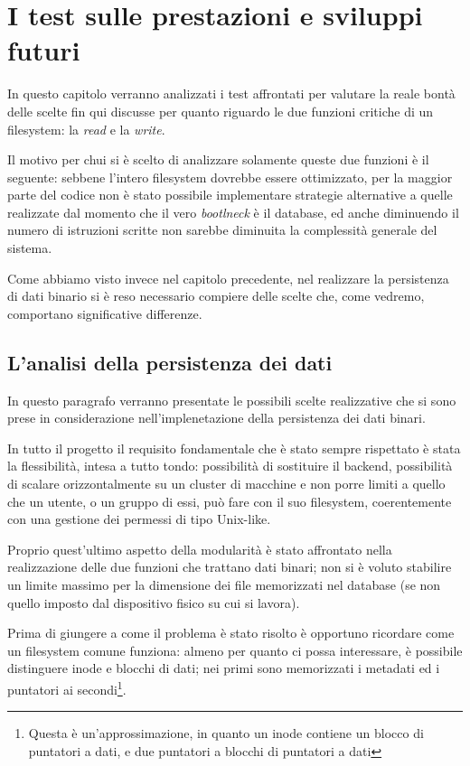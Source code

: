 \chapter{I test sulle prestazioni e sviluppi futuri}

In questo capitolo verranno analizzati i test affrontati per valutare la reale bontà delle scelte fin qui discusse per quanto riguardo le due funzioni critiche di un filesystem: la \emph{read} e la \emph{write}.

Il motivo per chui si è scelto di analizzare solamente queste due funzioni è il seguente: sebbene l'intero filesystem dovrebbe essere ottimizzato, per la maggior parte del codice non è stato possibile implementare strategie alternative a quelle realizzate dal momento che il vero \emph{bootlneck} è il database, ed anche diminuendo il numero di istruzioni scritte non sarebbe diminuita la complessità generale del sistema.

Come abbiamo visto invece nel capitolo precedente, nel realizzare la persistenza di dati binario si è reso necessario compiere delle scelte che, come vedremo, comportano significative differenze.

\section{L'analisi della persistenza dei dati}
In questo paragrafo verranno presentate le possibili scelte realizzative che si sono prese in considerazione nell'implenetazione della persistenza dei dati binari.

In tutto il progetto il requisito fondamentale che è stato sempre rispettato è stata la flessibilità, intesa a tutto tondo: possibilità di sostituire il backend, possibilità di scalare orizzontalmente su un cluster di macchine e non porre limiti a quello che un utente, o un gruppo di essi, può fare con il suo filesystem, coerentemente con una gestione dei permessi di tipo Unix-like.

Proprio quest'ultimo aspetto della modularità è stato affrontato nella realizzazione delle due funzioni che trattano dati binari; non si è voluto stabilire un limite massimo per la dimensione dei file memorizzati nel database (se non quello imposto dal dispositivo fisico su cui si lavora).

Prima di giungere a come il problema è stato risolto è opportuno ricordare come un filesystem comune funziona: almeno per quanto ci possa interessare, è possibile distinguere inode e blocchi di dati; nei primi sono memorizzati i metadati ed i puntatori ai secondi\footnote{Questa è un'approssimazione, in quanto un inode contiene un blocco di puntatori a dati, e due puntatori a blocchi di puntatori a dati}. 

